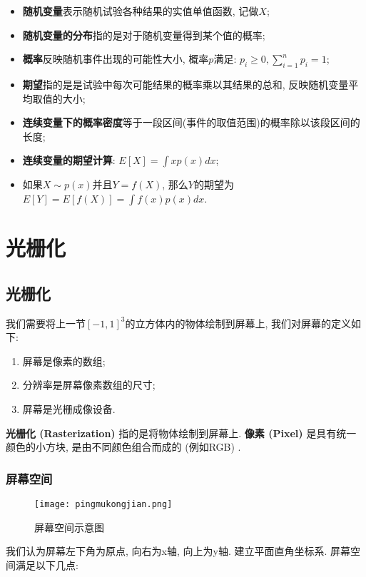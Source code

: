 \documentclass[openany]{progbookcn}
\begin{document}
\begin{itemize}
	\item \textbf{随机变量}表示随机试验各种结果的实值单值函数, 记做$X$; 
	\item \textbf{随机变量的分布}指的是对于随机变量得到某个值的概率; 
	\item \textbf{概率}反映随机事件出现的可能性大小, 概率$p$满足: $p_i\ge 0,\sum_{i=1}^{n}p_i=1$; 
	\item \textbf{期望}指的是是试验中每次可能结果的概率乘以其结果的总和, 反映随机变量平均取值的大小; 
	\item \textbf{连续变量下的概率密度}等于一段区间(事件的取值范围)的概率除以该段区间的长度; 
	\item \textbf{连续变量的期望计算}: $E[X]=\int xp(x)dx$; 
	\item 如果$X\sim p(x)$并且$Y=f(X)$, 那么$Y$的期望为$E[Y]=E[f(X)]=\int f(x)p(x)dx$.
\end{itemize}


\part{光栅化}

\chapter{光栅化}

我们需要将上一节$[-1,1]^3$的立方体内的物体绘制到屏幕上, 我们对屏幕的定义如下: 

\begin{enumerate}
	\item 屏幕是像素的数组; 
	\item 分辨率是屏幕像素数组的尺寸; 
	\item 屏幕是光栅成像设备. 
\end{enumerate}

\textbf{光栅化 (Rasterization) }指的是将物体绘制到屏幕上. \textbf{像素 (Pixel) }是具有统一颜色的小方块, 是由不同颜色组合而成的 (例如RGB) . 

\section{屏幕空间}

\begin{figure}[H]
	\centering
	\texttt{[image: pingmukongjian.png]}
	\caption{屏幕空间示意图}
	\label{fig:projection}
\end{figure}

我们认为屏幕左下角为原点, 向右为x轴, 向上为y轴. 建立平面直角坐标系. 屏幕空间满足以下几点: 
\end{document}
